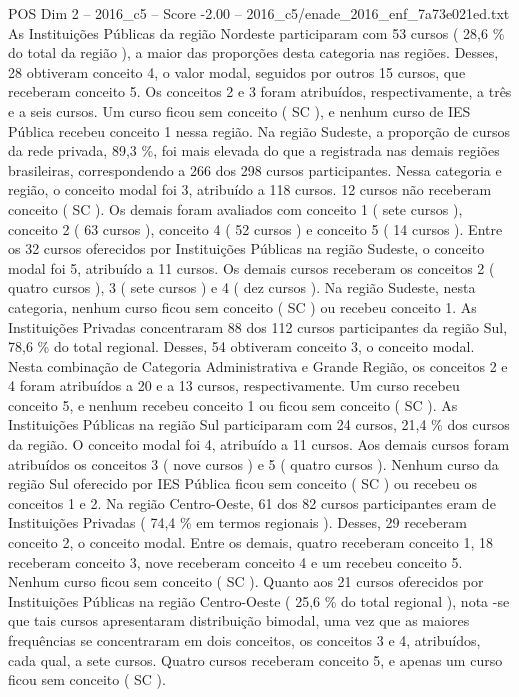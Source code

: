 \begin{textsample}{POS Dim 2 – 2016\_c5 – Score -2.00 – 2016\_c5/enade\_2016\_enf\_7a73e021ed.txt}
As Instituições Públicas da região Nordeste participaram com 53 cursos ( 28,6 \% do total da região ), a maior das proporções desta categoria nas regiões.
Desses, 28 obtiveram conceito 4, o valor modal, seguidos por outros 15 cursos, que receberam conceito 5.
Os conceitos 2 e 3 foram atribuídos, respectivamente, a três e a seis cursos.
Um curso ficou sem conceito ( SC ), e nenhum curso de IES Pública recebeu conceito 1 nessa região.
Na região Sudeste, a proporção de cursos da rede privada, 89,3 \%, foi mais elevada do que a registrada nas demais regiões brasileiras, correspondendo a 266 dos 298 cursos participantes.
Nessa categoria e região, o conceito modal foi 3, atribuído a 118 cursos. 12 cursos não receberam conceito ( SC ).
Os demais foram avaliados com conceito 1 ( sete cursos ), conceito 2 ( 63 cursos ), conceito 4 ( 52 cursos ) e conceito 5 ( 14 cursos ).
Entre os 32 cursos oferecidos por Instituições Públicas na região Sudeste, o conceito modal foi 5, atribuído a 11 cursos.
Os demais cursos receberam os conceitos 2 ( quatro cursos ), 3 ( sete cursos ) e 4 ( dez cursos ).
Na região Sudeste, nesta categoria, nenhum curso ficou sem conceito ( SC ) ou recebeu conceito 1.
As Instituições Privadas concentraram 88 dos 112 cursos participantes da região Sul, 78,6 \% do total regional.
Desses, 54 obtiveram conceito 3, o conceito modal.
Nesta combinação de Categoria Administrativa e Grande Região, os conceitos 2 e 4 foram atribuídos a 20 e a 13 cursos, respectivamente.
Um curso recebeu conceito 5, e nenhum recebeu conceito 1 ou ficou sem conceito ( SC ).
As Instituições Públicas na região Sul participaram com 24 cursos, 21,4 \% dos cursos da região.
O conceito modal foi 4, atribuído a 11 cursos.
Aos demais cursos foram atribuídos os conceitos 3 ( nove cursos ) e 5 ( quatro cursos ).
Nenhum curso da região Sul oferecido por IES Pública ficou sem conceito ( SC ) ou recebeu os conceitos 1 e 2.
Na região Centro-Oeste, 61 dos 82 cursos participantes eram de Instituições Privadas ( 74,4 \% em termos regionais ).
Desses, 29 receberam conceito 2, o conceito modal.
Entre os demais, quatro receberam conceito 1, 18 receberam conceito 3, nove receberam conceito 4 e um recebeu conceito 5.
Nenhum curso ficou sem conceito ( SC ).
Quanto aos 21 cursos oferecidos por Instituições Públicas na região Centro-Oeste ( 25,6 \% do total regional ), nota -se que tais cursos apresentaram distribuição bimodal, uma vez que as maiores frequências se concentraram em dois conceitos, os conceitos 3 e 4, atribuídos, cada qual, a sete cursos.
Quatro cursos receberam conceito 5, e apenas um curso ficou sem conceito ( SC ).

\end{textsample}
